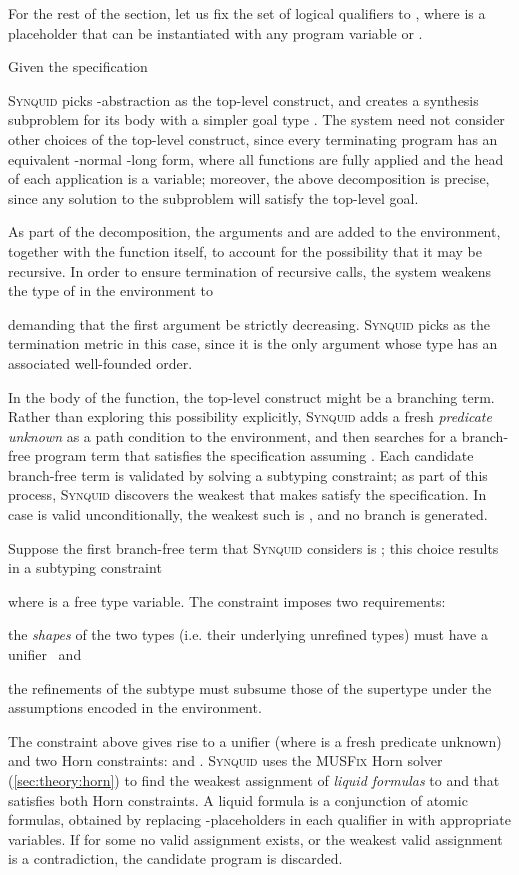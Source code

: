 \documentclass[10pt,preprint]{sigplanconf-pldi16}
\theoremstyle{definition}
\newcommand{\lang}{\textsc{Synquid}\xspace}
\newcommand{\tool}{\textsc{Synquid}\xspace}
\begin{document}
For the rest of the section, let us fix the set of logical qualifiers  to , 
where  is a placeholder that can be instantiated with any program variable or .

Given the specification 

\tool picks -abstraction as the top-level construct,
and creates a synthesis subproblem for its body with a simpler goal type .
The system need not consider other choices of the top-level construct,
since every terminating program has an equivalent -normal -long form,
where all functions are fully applied and the head of each application is a variable;
moreover, the above decomposition is precise, since any solution to the subproblem will satisfy the top-level goal.

As part of the decomposition, the arguments  and  are added to the environment, 
together with the function  itself, to account for the possibility that it may be recursive. 
In order to ensure termination of recursive calls,
the system weakens the type of  in the environment to

demanding that the first argument be strictly decreasing.
\lang picks  as the termination metric in this case,
since it is the only argument whose type has an associated well-founded order. 

In the body of the function, 
the top-level construct might be a branching term.
Rather than exploring this possibility explicitly,
\tool adds a fresh \emph{predicate unknown}  as a path condition to the environment,
and then searches for a branch-free program term that satisfies the specification assuming .
Each candidate branch-free term  is validated by solving a subtyping constraint;
as part of this process, \tool discovers the weakest  that makes  satisfy the specification.
In case  is valid unconditionally, the weakest such  is , and no branch is generated.

Suppose the first branch-free term that \tool considers is ;
this choice results in a subtyping constraint

where  is a free type variable.
The constraint imposes two requirements:
\begin{inparaenum}[(i)] 
\item the \emph{shapes} of the two types (i.e. their underlying unrefined types) must have a unifier~\cite{Pierce02} and 
\item the refinements of the subtype must subsume those of the supertype under the assumptions encoded in the environment.
\end{inparaenum}
The constraint above gives rise to a unifier  (where  is a fresh predicate unknown)
and two Horn constraints:  and .
\tool uses the \textsc{MUSFix} Horn solver (\autoref{sec:theory:horn}) to find the weakest assignment of \emph{liquid formulas} to  and 
that satisfies both Horn constraints.
A liquid formula is a conjunction of atomic formulas,
obtained by replacing -placeholders in each qualifier in  with appropriate variables.
If for some  no valid assignment exists,
or the weakest valid assignment is a contradiction,
the candidate program is discarded.
\end{document}
